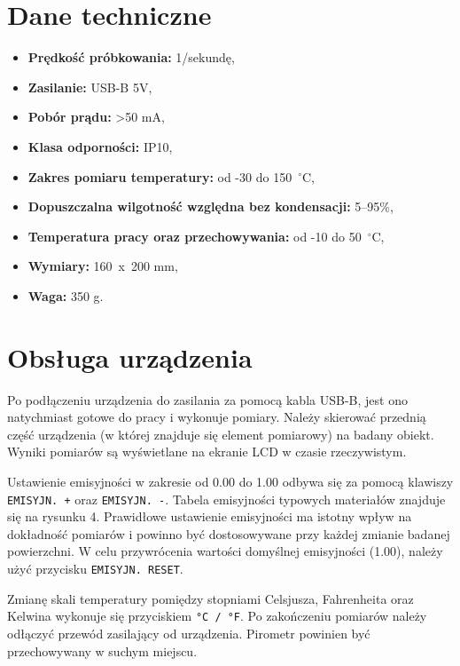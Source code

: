\section{Dane techniczne}
\begin{itemize}
    \item \textbf{Prędkość próbkowania:} 1/sekundę,
    \item \textbf{Zasilanie:} USB-B 5V,
    \item \textbf{Pobór prądu:} >50 mA,
    \item \textbf{Klasa odporności:} IP10,
    \item \textbf{Zakres pomiaru temperatury:} od -30 do 150~$^{\circ}$C,
    \item \textbf{Dopuszczalna wilgotność względna bez kondensacji:} 5--95\%,
    \item \textbf{Temperatura pracy oraz przechowywania:} od -10 do 50~$^{\circ}$C,
    \item \textbf{Wymiary:} 160~x~200 mm,
    \item \textbf{Waga:} 350 g.
\end{itemize}

\section{Obsługa urządzenia}
Po podłączeniu urządzenia do zasilania za pomocą kabla USB-B, jest ono natychmiast gotowe do pracy i wykonuje pomiary. Należy skierować przednią część urządzenia (w której znajduje się element pomiarowy) na badany obiekt. Wyniki pomiarów są wyświetlane na ekranie LCD w czasie rzeczywistym.

\vspace{12pt}

Ustawienie emisyjności w zakresie od 0.00 do 1.00 odbywa się za pomocą klawiszy \texttt{EMISYJN. +} oraz \texttt{EMISYJN. -}. Tabela emisyjności typowych materiałów znajduje się na rysunku 4. Prawidłowe ustawienie emisyjności ma istotny wpływ na dokładność pomiarów i powinno być dostosowywane przy każdej zmianie badanej powierzchni. W celu przywrócenia wartości domyślnej emisyjności (1.00), należy użyć przycisku \texttt{EMISYJN. RESET}.

\vspace{12pt}

Zmianę skali temperatury pomiędzy stopniami Celsjusza, Fahrenheita oraz Kelwina wykonuje się przyciskiem \texttt{°C / °F}. Po zakończeniu pomiarów należy odłączyć przewód zasilający od urządzenia. Pirometr powinien być przechowywany w suchym miejscu.

